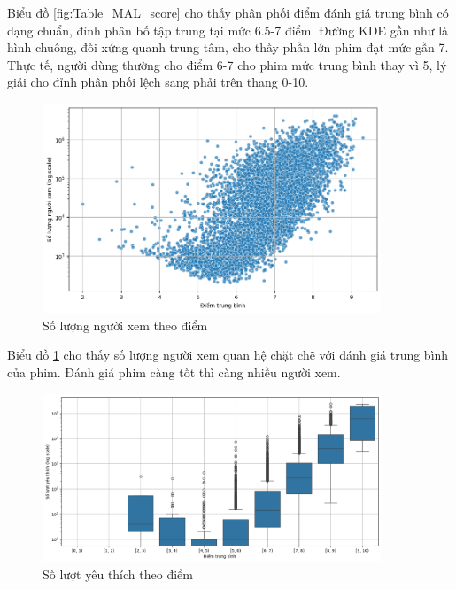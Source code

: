     \FloatBarrier
    
    Biểu đồ \ref{fig:Table_MAL_score} cho thấy phân phối điểm đánh giá trung bình có dạng chuẩn, đỉnh phân bố tập trung tại mức 6.5-7 điểm. Đường KDE gần như là hình chuông, đối xứng quanh trung tâm, cho thấy phần lớn phim đạt mức gần 7. Thực tế, người dùng thường cho điểm 6-7 cho phim mức trung bình thay vì 5, lý giải cho đỉnh phân phối lệch sang phải trên thang 0-10.

    \begin{figure}[htp]
        \centering
        \includegraphics[width=0.90\textwidth]{images/Table_MAL_member_score.png}
        \caption{Số lượng người xem theo điểm}
        \label{fig:Table_MAL_member_score}
    \end{figure}

    \FloatBarrier

    Biểu đồ \ref{fig:Table_MAL_member_score} cho thấy số lượng người xem quan hệ chặt chẽ với đánh giá trung bình của phim. Đánh giá phim càng tốt thì càng nhiều người xem. 
    
    \begin{figure}[htp]
        \centering
        \includegraphics[width=0.90\textwidth]{images/Table_MAL_favorite_score.png}
        \caption{Số lượt yêu thích theo điểm}
        \label{fig:Table_MAL_favorite_score}
    \end{figure}

